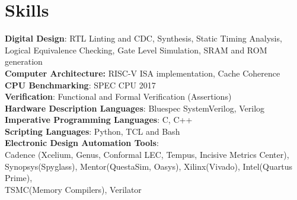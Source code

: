 \section{\sc Skills}

{\bf{Digital Design}}: RTL Linting and CDC, Synthesis, Static Timing Analysis,\\
Logical Equivalence Checking, Gate Level Simulation, SRAM and ROM generation \\
{\bf{Computer Architecture:}} RISC-V ISA implementation, Cache Coherence\\
{\bf{CPU Benchmarking}}: SPEC CPU 2017 \\
{\bf{Verification}}: Functional and Formal Verification (Assertions)\\
{\bf{Hardware Description Languages}}: Bluespec SystemVerilog, Verilog \\
{\bf{Imperative Programming Languages}}: C, C++ \\
{\bf{Scripting Languages}}: Python, TCL and Bash  \\
{\bf{Electronic Design Automation Tools}}: \\ 
Cadence (Xcelium, Genus, Conformal LEC, Tempus, Incisive Metrics Center), \\
Synopsys(Spyglass), Mentor(QuestaSim, Oasys), Xilinx(Vivado), Intel(Quartus Prime), 
\\ TSMC(Memory Compilers), Verilator 

\endinput
